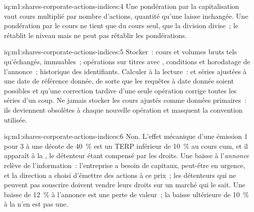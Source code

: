 \begin{solution}{iq:m1:shares-corporate-actions-indices:4}
Une pondération par la capitalisation vaut cours multiplié par nombre d'actions, quantité qu'une  laisse
inchangée. Une pondération par le cours ne tient que du cours seul, que la division divise~; le
 rétablit le niveau mais ne peut pas rétablir les pondérations.
\end{solution}

\begin{solution}{iq:m1:shares-corporate-actions-indices:5}
Stocker~: cours et volumes bruts tels qu'échangés, immuables~; opérations sur titres avec , conditions et horodatage de l'annonce~; historique des identifiants. Calculer à la
lecture~:  et séries ajustées à une date de référence donnée, de sorte que
les requêtes à date donnée soient possibles et qu'une correction tardive d'une seule opération corrige
toutes les séries d'un coup. Ne jamais stocker les cours ajustés comme données primaires~: ils deviennent
obsolètes à chaque nouvelle opération et masquent la convention utilisée.
\end{solution}

\begin{solution}{iq:m1:shares-corporate-actions-indices:6}
Non. L'effet mécanique d'une émission 1 pour 3 à une décote de 40~\% est un TERP
inférieur de 10~\% au cours cum, et il apparaît à la \emph{}, le détenteur
étant compensé par les droits. Une baisse à l'\emph{annonce} relève de l'information~: l'entreprise a besoin de
capitaux, peut-être en urgence, et la direction a choisi d'émettre des actions à ce prix~; les détenteurs qui ne peuvent pas souscrire doivent vendre
leurs droits sur un marché qui le sait. Une baisse de 12~\% à l'annonce
est une perte de valeur~; la baisse ultérieure de 10~\% à la 
n'en est pas une.
\end{solution}
